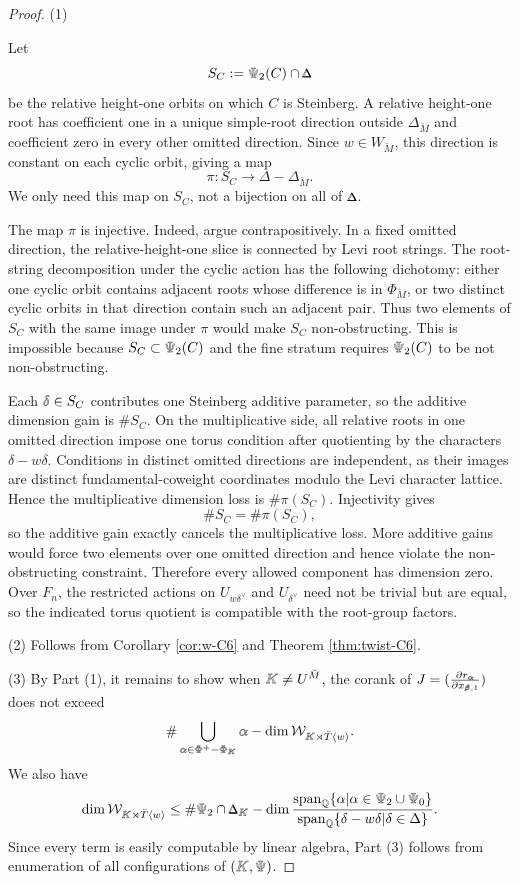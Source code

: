 \documentclass[11pt]{amsart}
\newcommand{\MAJOREDIT}[1]{{\color{revisiongreen}#1}}
\theoremstyle{definition}
\newcommand{\doublestroke}[1]{\pdfliteral{1 Tr .3 w}#1\pdfliteral{0 Tr 0 w}}
\newcommand{\BPhi}{\doublestroke{\Phi}}
\newcommand{\BPsi}{\doublestroke{\Psi}}
\newcommand{\BK}{\doublestroke{K}}
\newcommand{\Balpha}{\doublestroke{\alpha}}
\newcommand{\Bbeta}{\doublestroke{\beta}}
\newcommand{\Bdelta}{\doublestroke{\delta}}
\newcommand{\BDelta}{%
    \scalebox{.8}{$\Delta$}%
    \llap{%
            \scalebox{.9}{$\Delta$}%
    }%
}
\newcommand{\Q}{\mathbb{Q}}
\newcommand{\cW}{\mathcal{W}}
\newcommand{\bM}{\breve{M}}
\newcommand{\bT}{\breve{T}}
\DeclareMathOperator{\Span}{span}
\begin{document}
\begin{proof}
(1) 
\MAJOREDIT{Let
\[
S_C:=\BPsi_2(C)\cap\BDelta
\]
be the relative height-one orbits on which $C$ is Steinberg. A relative
height-one root has coefficient one in a unique simple-root direction outside
$\Delta_{\bM}$ and coefficient zero in every other omitted direction. Since
$w\in W_{\bM}$, this direction is constant on each cyclic orbit, giving a map
\[
\pi:S_C\longrightarrow\Delta-\Delta_{\bM}.
\]
We only need this map on $S_C$, not a bijection on all of $\BDelta$.

The map $\pi$ is injective. Indeed, argue contrapositively. In a fixed omitted
direction, the relative-height-one slice is connected by Levi root strings.
The root-string decomposition under the cyclic action has the following
dichotomy: either one cyclic orbit contains adjacent roots whose difference is
in $\Phi_{\bM}$, or two distinct cyclic orbits in that direction contain such
an adjacent pair. Thus two elements of $S_C$ with the same image under $\pi$
would make $S_C$ non-obstructing. This is impossible because
$S_C\subset\BPsi_2(C)$ and the fine stratum requires $\BPsi_2(C)$ to be not
non-obstructing.

Each $\Bdelta\in S_C$ contributes one Steinberg additive parameter, so the
additive dimension gain is $\#S_C$. On the multiplicative side, all relative
roots in one omitted direction impose one torus condition after quotienting by
the characters $\delta-w\delta$. Conditions in distinct omitted directions are
independent, as their images are distinct fundamental-coweight coordinates
modulo the Levi character lattice. Hence the multiplicative dimension loss is
$\#\pi(S_C)$. Injectivity gives
\[
\#S_C=\#\pi(S_C),
\]
so the additive gain exactly cancels the multiplicative loss. More additive
gains would force two elements over one omitted direction and hence violate the
non-obstructing constraint. Therefore every allowed component has dimension
zero. Over $F_n$, the restricted actions on $U_{w\delta^\vee}$ and
$U_{\delta^\vee}$ need not be trivial but are equal, so the indicated torus
quotient is compatible with the root-group factors.}

(2) Follows from Corollary \ref{cor:w-C6}
and Theorem \ref{thm:twist-C6}.

(3)
By Part (1),
it remains to show
when $\BK\neq U^{\bM}$,
the corank of 
$J=(\frac{\partial r_{\Balpha}}{\partial x_{\Bbeta,1}})$
does not exceed
\[
\#\bigcup_{\Balpha\in \BPhi^+-\BPhi_{\BK}}\Balpha
-
\dim \cW_{\BK\rtimes \bT \langle w\rangle}.
\]
We also have
\[
\dim \cW_{\BK\rtimes \bT \langle w\rangle}
\le
\# \BPsi_2\cap \BDelta_{\BK}
-\dim \frac{\Span_{\Q}\{\alpha|\alpha\in \BPsi_2\cup
\BPsi_0\}}{
\Span_{\Q}\{\delta-w \delta| \delta\in \Delta\}}.
\]
Since every term is easily computable by linear algebra,
Part (3) follows from enumeration
of all configurations of $(\BK, \BPsi)$.
\end{proof}
\end{document}

